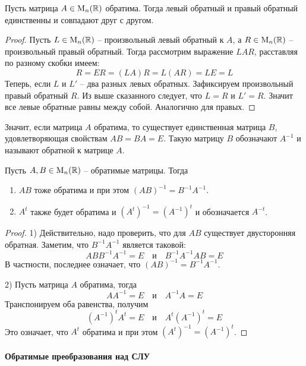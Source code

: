 \begin{claim*}
Пусть матрица $A\in\operatorname{M}_{n}(\mathbb R)$ обратима.
Тогда левый обратный и правый обратный единственны и совпадают друг с другом.
\end{claim*}
\begin{proof}
Пусть $L\in\operatorname{M}_{n}(\mathbb R)$ -- произвольный левый обратный к $A$, а $R\in\operatorname{M}_{n}(\mathbb R)$ -- произвольный правый обратный.
Тогда рассмотрим выражение $LAR$, расставляя по разному скобки имеем:
\[
R = ER = (LA)R = L (AR) = LE = L
\]
Теперь, если $L$ и $L'$ -- два разных левых обратных.
Зафиксируем произвольный правый обратный $R$.
Из выше сказанного следует, что $L = R$ и $L' = R$.
Значит все левые обратные равны между собой.
Аналогично для правых.
\end{proof}

Значит, если матрица $A$ обратима, то существует единственная матрица $B$, удовлетворяющая свойствам $AB = BA = E$.
Такую матрицу $B$ обозначают $A^{-1}$ и называют обратной к матрице $A$.

\begin{claim*}
Пусть $A, B\in \operatorname{M}_{n}(\mathbb R)$ -- обратимые матрицы.
Тогда 
\begin{enumerate}
\item $AB$ тоже обратима и при этом $(AB)^{-1} = B^{-1}A^{-1}$.

\item  $A^t$ также будет обратима и $(A^t)^{-1} = (A^{-1})^t$ и обозначается $A^{-t}$.
\end{enumerate}
\end{claim*}
\begin{proof}
1) Действительно, надо проверить, что для $AB$ существует двусторонняя обратная.
Заметим, что $B^{-1}A^{-1}$ является таковой:
\[
AB B^{-1}A^{-1} = E \quad\text{и}\quad B^{-1}A^{-1} AB = E
\]
В частности, последнее означает, что $(AB)^{-1} = B^{-1}A^{-1}$.

2) Пусть матрица $A$ обратима, тогда
\[
A A^{-1} = E\quad \text{и}\quad A^{-1}A = E
\]
Транспонируем оба равенства, получим
\[
(A^{-1})^t A^t = E\quad \text{и}\quad A^t (A^{-1})^t = E
\]
Это означает, что $A^t$ обратима и при этом $(A^t)^{-1} = (A^{-1})^t$.
\end{proof}

\paragraph{Обратимые преобразования над СЛУ} 


